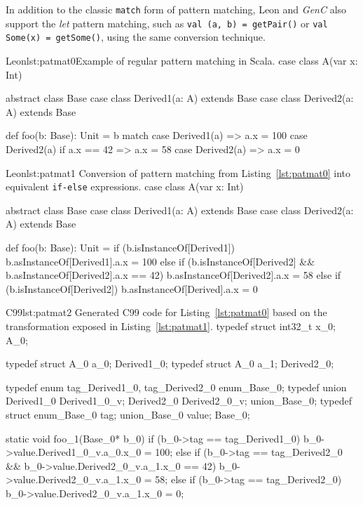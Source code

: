 \documentclass[a4paper,twoside]{article}
\newcommand{\Inline}[1]{\lstinline[basicstyle=\ttfamily]|#1|}
\newcommand{\InlineS}[1]{\lstinline[language=Leon]|#1|}
\newcommand{\GenC}{\emph{GenC}\xspace}
\newcommand{\RefCode}[1]{Listing~\ref{#1}}
\begin{document}
In addition to the classic \InlineS{match} form of pattern matching, Leon and
\GenC also support the \emph{let} pattern matching, such as \InlineS{val (a, b)
= getPair()} or \InlineS{val Some(x) = getSome()}, using the same conversion
technique.

\begin{Code}{Leon}{lst:patmat0}{Example of regular pattern matching in Scala.}
case class A(var x: Int)

abstract class Base
case class Derived1(a: A) extends Base
case class Derived2(a: A) extends Base

def foo(b: Base): Unit = b match {
  case Derived1(a)              => a.x = 100
  case Derived2(a) if a.x == 42 => a.x = 58
  case Derived2(a)              => a.x = 0
}
\end{Code}

\begin{Code}{Leon}{lst:patmat1}{%
Conversion of pattern matching from \RefCode{lst:patmat0} \hspace{\textwidth}%
into equivalent \Inline{if-else} expressions.}
case class A(var x: Int)

abstract class Base
case class Derived1(a: A) extends Base
case class Derived2(a: A) extends Base

def foo(b: Base): Unit = {
  if (b.isInstanceOf[Derived1]) { b.asInstanceOf[Derived1].a.x = 100 }
  else if (b.isInstanceOf[Derived2] && b.asInstanceOf[Derived2].a.x == 42) {
    b.asInstanceOf[Derived2].a.x = 58
  } else if (b.isInstanceOf[Derived2]) { b.asInstanceOf[Derived].a.x = 0 }
}
\end{Code}

\begin{Code}{C99}{lst:patmat2}{%
Generated C99 code for \RefCode{lst:patmat0} based on the transformation \hspace{\textwidth}%
exposed in \RefCode{lst:patmat1}.}
typedef struct { int32_t x_0; } A_0;

typedef struct { A_0 a_0; } Derived1_0;
typedef struct { A_0 a_1; } Derived2_0;

typedef enum { tag_Derived1_0, tag_Derived2_0 } enum_Base_0;
typedef union { Derived1_0 Derived1_0_v; Derived2_0 Derived2_0_v; }
        union_Base_0;
typedef struct { enum_Base_0 tag; union_Base_0 value; } Base_0;

static void foo_1(Base_0* b_0) {
    if (b_0->tag == tag_Derived1_0) {
        b_0->value.Derived1_0_v.a_0.x_0 = 100;
    } else if (b_0->tag == tag_Derived2_0 &&
               b_0->value.Derived2_0_v.a_1.x_0 == 42) {
        b_0->value.Derived2_0_v.a_1.x_0 = 58;
    } else if (b_0->tag == tag_Derived2_0) {
        b_0->value.Derived2_0_v.a_1.x_0 = 0;
    }
}
\end{Code}
\end{document}
